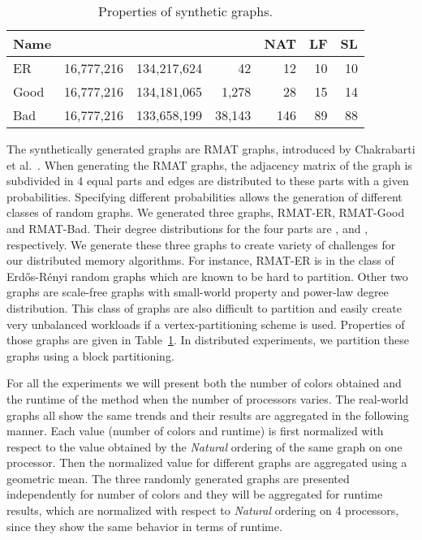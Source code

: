 \documentclass{article}
\begin{document}
\begin{table}
  \centering
  \begin{tabular}{|l|r|r|r|r|r|r|} \hline
    \multicolumn{1}{|c|}{Name} & \multicolumn{1}{|c|}{} & \multicolumn{1}{|c|}{} & \multicolumn{1}{|c|}{} & \multicolumn{1}{|c|}{NAT} & \multicolumn{1}{|c|}{LF} & \multicolumn{1}{|c|}{SL}\\\hline
    ER   & 16,777,216 & 134,217,624 &     42 & 12  & 10 & 10\\
    Good & 16,777,216 & 134,181,065 &  1,278 & 28  & 15 & 14\\
    Bad  & 16,777,216 & 133,658,199 & 38,143 & 146 & 89 & 88 \\ \hline
  \end{tabular}
  \caption{Properties of synthetic graphs.}
  \label{tab:prop_rmat}
\end{table}

The synthetically generated graphs are RMAT graphs,
introduced by Chakrabarti et al.~\cite{RMAT}. 
When generating the RMAT graphs, the adjacency matrix of 
the graph is subdivided in 4 equal parts and edges are
distributed to these parts with a given probabilities.
Specifying different probabilities
allows the generation of different classes of random graphs. 
We generated three graphs, RMAT-ER, RMAT-Good and RMAT-Bad. Their degree
distributions for the four parts are , 
 and , respectively.
We generate these three graphs to create variety of challenges
for our distributed memory algorithms. For instance, RMAT-ER is
in the class of Erd\H os-R\'enyi random graphs which are known to be hard to
partition. Other two graphs are scale-free graphs with small-world
property and power-law degree distribution. This class of graphs
are also difficult to partition and easily create very unbalanced workloads
if a vertex-partitioning scheme is used. Properties of those graphs
are given in Table~\ref{tab:prop_rmat}. In distributed experiments, 
we partition these graphs using a block partitioning.

For all the experiments we will present both the number of colors
obtained and the runtime of the method when the number of processors
varies. The real-world graphs all show the same trends and their
results are aggregated in the following manner. Each value (number of
colors and runtime) is first normalized with respect to the value
obtained by the {\em Natural} ordering of the same graph on one
processor. Then the normalized value for different graphs are
aggregated using a geometric mean. The three randomly generated graphs
are presented independently for number of colors and they will be aggregated
for runtime results, which are normalized with respect to {\em Natural}
ordering on 4 processors, since they show the same behavior in terms of runtime.
\end{document}
